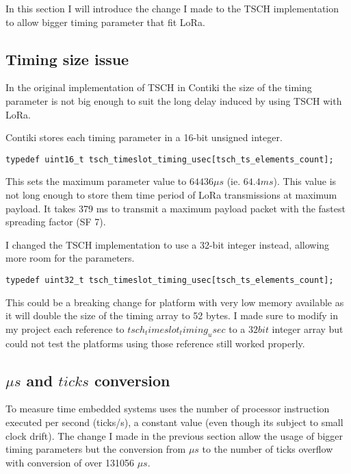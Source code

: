 In this section I will introduce the change I made to the TSCH implementation
to allow bigger timing parameter that fit LoRa.

\subsection{Timing size issue}

In the original implementation of TSCH in Contiki the size of the timing parameter
is not big enough to suit the long delay induced by using TSCH with LoRa.

Contiki stores each timing parameter in a 16-bit unsigned integer.

\begin{lstlisting}
typedef uint16_t tsch_timeslot_timing_usec[tsch_ts_elements_count];
\end{lstlisting}

This sets the maximum parameter value to $64436\mu s$ (ie. $64.4 ms$).
This value is not long enough to store them time period of LoRa transmissions
at maximum payload.
It takes 379 ms to transmit a maximum payload packet with the fastest spreading
factor (SF 7).

I changed the TSCH implementation to use a 32-bit integer instead, allowing more
room for the parameters.

\begin{lstlisting}
typedef uint32_t tsch_timeslot_timing_usec[tsch_ts_elements_count];
\end{lstlisting}

This could be a breaking change for platform with very low memory available as
it will double the size of the timing array to 52 bytes.
I made sure to modify in my project each reference to
$tsch_timeslot_timing_usec$ to a $32 bit$ integer array but could not test the
platforms using those reference still worked properly.

\subsection{$\mu s$ and $ticks$ conversion}

To measure time embedded systems uses the number of processor instruction executed
per second (ticks/s), a constant value (even though its subject to small clock drift).
The change I made in the previous section allow the usage of bigger timing
parameters but the conversion from $\mu s$ to the number of ticks overflow
with conversion of over 131056 $\mu s$.

